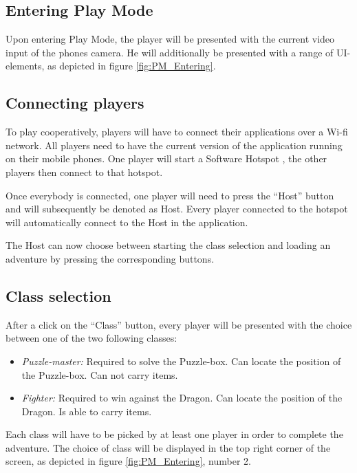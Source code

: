 \documentclass{sigchi-ext}
\begin{document}
\subsection{Entering Play Mode}

Upon entering Play Mode, the player will be presented with the current video input of the phones camera. He will additionally be presented with a range of UI-elements, as depicted in figure \ref{fig:PM_Entering}.


\subsection{Connecting players}
To play cooperatively, players will have to connect their applications over a Wi-fi network. All players need to have the current version of the application running on their mobile phones. One player will start a Software Hotspot \cite{desc:hotspot}, the other players then connect to that hotspot.

Once everybody is connected, one player will need to press the ``Host'' button and will subsequently be denoted as Host. Every player connected to the hotspot will automatically connect to the Host in the application. 

The Host can now choose between starting the class selection and loading an adventure by pressing the corresponding buttons.



\subsection{Class selection}

After a click on the ``Class'' button, every player will be presented with the choice between one of the two following classes:
\begin{itemize}\compresslist%
	\item \textit{Puzzle-master:} Required to solve the Puzzle-box. Can locate the position of the Puzzle-box. Can not carry items.
	\item \textit{Fighter:} Required to win against the Dragon. Can locate the position of the Dragon. Is able to carry items.
\end{itemize}

Each class will have to be picked by at least one player in order to complete the adventure. The choice of class will be displayed in the top right corner of the screen, as depicted in figure \ref{fig:PM_Entering}, number 2.
\end{document}
